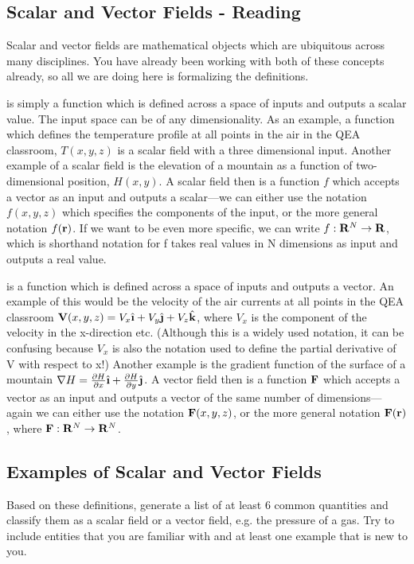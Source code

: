 \documentclass{tufte-handout}
\begin{document}
\begin{enumerate}[series=exercises, label=\textbf{Exercise} (\arabic*)]
\subsection{Scalar and Vector Fields - Reading}
Scalar and vector fields are mathematical objects which are ubiquitous across many disciplines.  You have already been working with both of these concepts already, so all we are doing here is formalizing the definitions.

 is simply a function which is defined across a space of inputs and outputs a scalar value.  The input space can be of any dimensionality.  As an example, a function which defines the temperature profile at all points in the air in the QEA classroom, $T(x,y,z)$ is a scalar field with a three dimensional input.  Another example of a scalar field is the elevation of a mountain as a function of two-dimensional position, $H(x,y)$.  A scalar field then is a function $f$ which accepts a vector as an input and outputs a scalar---we can either use the notation $f(x,y,z)$ which specifies the components of the input, or the more general notation $f(\mathbf{r})$. If we want to be even more specific, we can write $f: \mathbf{R}^N \rightarrow \mathbf{R}$, which is shorthand notation for f takes real values in N dimensions as input and outputs a real value.

 is a function which is defined across a space of inputs and outputs a vector.  An example of this would be the velocity of the air currents at all points in the QEA classroom $\V(x,y,z) = V_x \ihat + V_y \jhat + V_z \khat$, where $V_x$ is the component of the velocity in the x-direction etc. (Although this is a widely used notation, it can be confusing because $V_x$ is also the notation used to define the partial derivative of V with respect to x!)  Another example is the gradient function of the surface of a mountain $\nabla H = \frac{\partial H}{\partial x} \ihat + \frac{\partial H}{\partial y} \jhat$. A vector field then is a function $\mathbf{F}$ which accepts a vector as an input and outputs a vector of the same number of dimensions---again we can either use the notation $\mathbf{F}(x,y,z)$, or the more general notation $\mathbf{F}(\mathbf{r})$, where $\mathbf{F}: \mathbf{R}^N \rightarrow \mathbf{R}^N$.

\subsection{Examples of Scalar and Vector Fields}
Based on these definitions, generate a list of at least 6 common quantities and classify them as a scalar field or a vector field, e.g. the pressure of a gas. Try to include entities that you are familiar with and at least one example that is new to you.


\end{enumerate}
\end{document}
